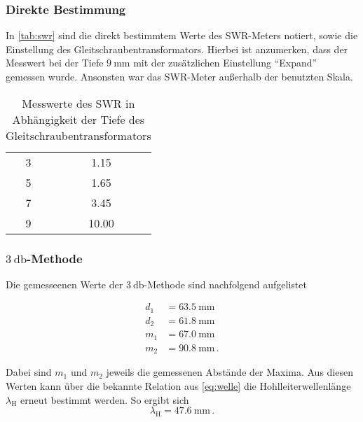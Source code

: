 \subsubsection{Direkte Bestimmung}
\label{sssec:a5}

In \autoref{tab:swr} sind die direkt bestimmtem Werte des SWR-Meters notiert, sowie die Einstellung des Gleitschraubentransformators.
Hierbei ist anzumerken, dass der Messwert bei der Tiefe $\SI{9}{\milli\meter}$ mit der zusätzlichen Einstellung \enquote{Expand} gemessen wurde.
Ansonsten war das SWR-Meter außerhalb der benutzten Skala.

\begin{table}
    \centering
    \caption{Messwerte des SWR in Abhängigkeit der Tiefe des Gleitschraubentransformators}
    \label{tab:swr}
    \begin{tabular}{S[table-format=1.0] S[table-format=2.2]}
        \toprule
         &  \\
         & 1.15 \\
        5 & 1.65 \\
        7 & 3.45 \\
        9 & 10.00 \\
        \bottomrule
    \end{tabular}
\end{table}

\subsubsection{\texorpdfstring{$\SI{3}{\decibel}$}{3dB}-Methode}
\label{sssec:a6}

Die gemesseenen Werte der $\SI{3}{\decibel}$-Methode sind nachfolgend aufgelistet

\begin{align*}
    d_1 &= \SI{63.5}{\milli\meter} \\
    d_2 &= \SI{61.8}{\milli\meter} \\
    m_1 &= \SI{67.0}{\milli\meter} \\
    m_2 &= \SI{90.8}{\milli\meter} \, .
\end{align*}

Dabei sind $m_1$ und $m_2$ jeweils die gemessenen Abstände der Maxima.
Aus diesen Werten kann über die bekannte Relation aus \autoref{eq:welle} die Hohlleiterwellenlänge $\lambda _\text{H}$ erneut bestimmt werden.
So ergibt sich 
\begin{equation*}
    \lambda _\text{H} = \SI{47.6}{\milli\meter} \, .
\end{equation*}

